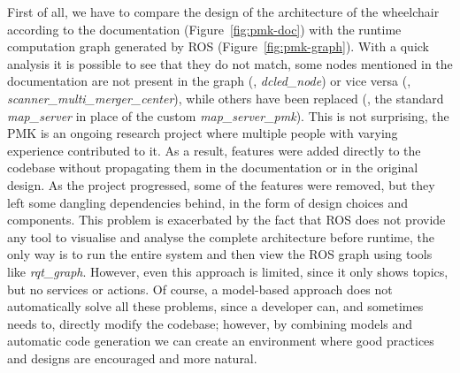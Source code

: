 First of all, we have to compare the design of the architecture of the wheelchair according to the documentation (Figure~\ref{fig:pmk-doc}) with the runtime computation graph generated by ROS (Figure~\ref{fig:pmk-graph}). With a quick analysis it is possible to see that they do not match, some nodes mentioned in the documentation are not present in the graph (\eg, \textit{dcled\_node}) or vice versa (\eg, \textit{scanner\_multi\_merger\_center}), while others have been replaced (\eg, the standard \textit{map\_server} in place of the custom \textit{map\_server\_pmk}). This is not surprising, the PMK is an ongoing research project where multiple people with varying experience contributed to it. As a result, features were added directly to the codebase without propagating them in the documentation or in the original design. As the project progressed, some of the features were removed, but they left some dangling dependencies behind, in the form of design choices and components. This problem is exacerbated by the fact that ROS does not provide any tool to visualise and analyse the complete architecture before runtime, the only way is to run the entire system and then view the ROS graph using tools like \textit{rqt\_graph}. However, even this approach is limited, since it only shows topics, but no services or actions. Of course, a model-based approach does not automatically solve all these problems, since a developer can, and sometimes needs to, directly modify the codebase; however, by combining models and automatic code generation we can create an environment where good practices and designs are encouraged and more natural.

